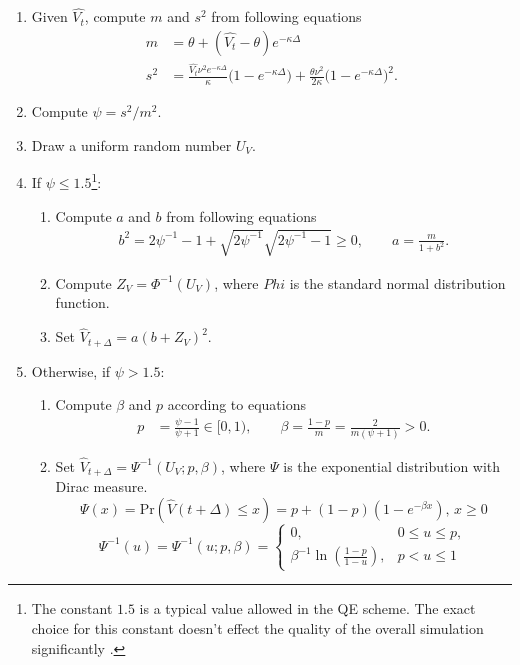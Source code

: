 \documentclass{ws-ijfe}
\begin{document}
\begin{enumerate}
\item Given $\hat{V_t}$, compute $m$ and $s^2$ from following equations
\begin{align*}
  m &=\theta + (\hat{V_t}-\theta)e^{-\kappa\Delta} \\
  s^2 &=\frac{\hat{V_t}\nu^2 e^{-\kappa\Delta}}{\kappa}\bigg(1-e^{-\kappa\Delta}\bigg)+\frac{\theta\nu^2}{2\kappa}\bigg(1-e^{-\kappa\Delta}\bigg)^2.
\end{align*}
\item Compute $\psi=s^2/m^2$.
\item Draw a uniform random number $U_V$.
\item If $\psi\leq1.5$\footnote{The constant $1.5$ is a typical value allowed in the QE scheme. The exact choice for this constant doesn't effect the quality of the overall simulation significantly \cite{Andersen2006}. }:
\begin{enumerate}
\item Compute $a$ and $b$ from following equations
\begin{align*}
b^2=2\psi^{-1}-1+\sqrt{2\psi^{-1}}\sqrt{2\psi^{-1}-1}\geq 0, \qquad a =\frac{m}{1+b^2}.
\end{align*}
\item Compute $Z_V=\Phi^{-1}(U_V)$, where $Phi$ is the standard normal distribution function.
\item Set $\hat{V}_{t+\Delta}=a(b+Z_V)^2$.
\end{enumerate}
\item Otherwise, if $\psi>1.5$:
\begin{enumerate}
  \item Compute $\beta$ and $p$ according to equations
  \begin{align*}
    p & =\frac{\psi-1}{\psi+1}\in[0,1), \qquad%
    \beta =\frac{1-p}{m}=\frac{2}{m(\psi+1)}>0.
  \end{align*}
  \item Set $\hat{V}_{t+\Delta}=\Psi^{-1}(U_V;p,\beta)$, where $\Psi$ is the exponential distribution with Dirac measure.
  \begin{equation*}
    \Psi(x) = \text{Pr}(\hat{V}(t+\Delta)\leq x) = p+(1-p)(1-e^{-\beta x}),\, x\geq 0
  \end{equation*}
  \[
  \Psi^{-1}(u)=\Psi^{-1}(u;p,\beta)=
  \begin{cases}
    0,\,&0\leq u \leq p,\\
    \beta^{-1}\ln(\frac{1-p}{1-u}),&p<u\leq1
  \end{cases}
  \]
\end{enumerate}
\end{enumerate}
\end{document}
